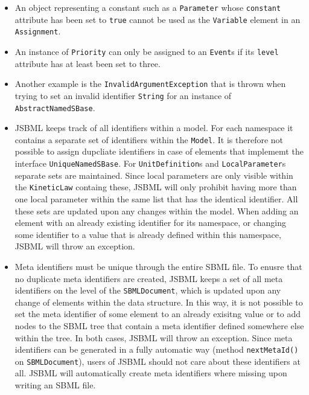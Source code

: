 \begin{itemize}
 \item An object representing a constant such as a
 \texttt{Parameter} whose \texttt{constant} attribute has been set to
\texttt{true} cannot be used as the \texttt{Variable} element in an
\texttt{Assignment}.
%
%
%
%
 \item An instance of \texttt{Priority} can only
 be assigned to an \texttt{Event}s if its
 \texttt{level} attribute has at least been set to
 three.
 \item Another example is the \texttt{InvalidArgumentException} that
 is thrown when trying to set an invalid identifier \texttt{String} for an
 instance of \texttt{AbstractNamedSBase}.
 \item JSBML keeps track of all identifiers within a model. For each namespace
 it contains a separate set of identifiers within the
 \texttt{Model}. It is therefore not possible to
 assign dupcliate identifiers in case of elements that implememt the interface
 \texttt{UniqueNamedSBase}.
 For \texttt{UnitDefinition}s
 and \texttt{LocalParameter}s separate sets are maintained. Since local
 parameters are only visible within the
 \texttt{KineticLaw} containg these,
 JSBML will only prohibit having more than one local parameter within the same
 list that has the identical identifier. All these sets are updated upon any
 changes within the model. When adding an element with an already existing
 identifier for its namespace, or changing some identifier to a value that is
 already defined within this namespace, JSBML will throw an exception.
 \item Meta identifiers must be unique through the entire SBML file. To enusre
 that no duplicate meta identifiers are created, JSBML keeps a set of all meta
 identifiers on the level of the
 \texttt{SBMLDocument}, which is
 updated upon any change of elements within the data structure. In this way, it
 is not possible to set the meta identifier of some element to an already
 exisitng value or to add nodes to the SBML tree that contain a meta identifier
 defined somewhere else within the tree. In both cases, JSBML will throw an
 exception. Since meta identifiers can be generated in a fully automatic way
 (method \texttt{nextMetaId()} on \texttt{SBMLDocument}), users of JSBML should
 not care about these identifiers at all. JSBML will automatically create meta
 identifiers where missing upon writing an SBML file.
\end{itemize}
